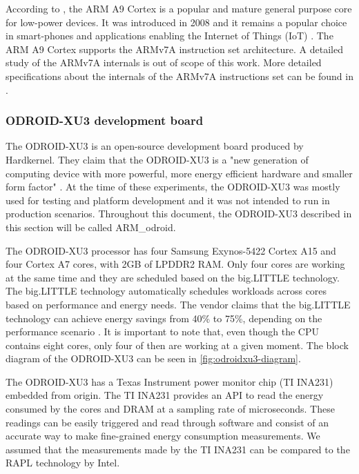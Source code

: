 According to \cite{CORTEXA9}, the ARM A9 Cortex is a popular and mature general
purpose core for low-power devices. It was introduced in 2008 and it remains a
popular choice in smart-phones and applications enabling the Internet of Things
(IoT) \cite{CORTEXA9}. The ARM A9 Cortex supports the ARMv7A 
instruction set architecture. A detailed study of the ARMv7A internals is out
of scope of this work. More detailed specifications about the
internals of the ARMv7A instructions set can be found in \cite{CORTEXA9}.


\subsubsection*{ODROID-XU3 development board}

The ODROID-XU3 \cite{ODROID_XU3} is an open-source development board produced by
 Hardkernel. They claim that the ODROID-XU3 is a "new generation of computing device
with more powerful, more energy efficient hardware and smaller form factor"
\cite{ODROID_XU3}. At the time of these experiments, the ODROID-XU3 was  mostly used for testing and platform development and it was not intended to run in production scenarios. Throughout this document, the ODROID-XU3 described in this section will be called ARM\_odroid.

The ODROID-XU3 processor has four Samsung Exynos-5422 Cortex A15 and four Cortex A7 cores,
with 2GB of LPDDR2 RAM. Only four cores are working at the same time and they are 
scheduled based on the big.LITTLE technology. The big.LITTLE technology
\cite{biglittle} automatically schedules workloads across cores based on
performance and energy needs. The vendor claims that the big.LITTLE technology
can achieve energy savings from 40\% to 
75\%, depending on the performance scenario \cite{biglittle}.
It is important to note that, even though the CPU contains eight cores, only four of then are working at a
given moment. The block diagram of the ODROID-XU3 can be seen in 
\ref{fig:odroidxu3-diagram}.


The ODROID-XU3 has a Texas Instrument power monitor chip (TI INA231) embedded
from origin. The TI INA231 provides an API to read the energy consumed by the 
cores and DRAM at a sampling rate of microseconds. These readings can be easily triggered and read
through software and consist of an accurate way to make fine-grained energy
consumption measurements. We assumed that the measurements made by the TI INA231 can 
be compared to the RAPL technology by Intel.


